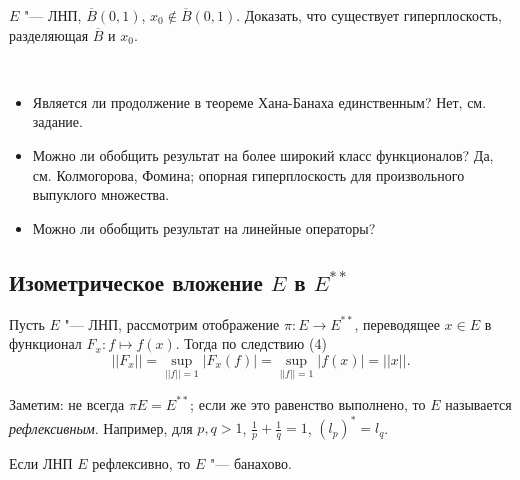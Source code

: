 \documentclass[main]{subfiles}
\begin{document}
\begin{exercise}
  $E$ "--- ЛНП, $\overline{B}(0, 1)$, $x_0 \notin \overline{B}(0, 1)$.
  Доказать, что существует гиперплоскость, разделяющая $\overline{B}$
  и $x_0$.
\end{exercise}

\begin{remark}~
  \begin{itemize}
    \item Является ли продолжение в теореме Хана-Банаха
      единственным? Нет, см. задание.
    \item Можно ли обобщить результат на более широкий класс
      функционалов? Да, см. Колмогорова, Фомина;
      опорная гиперплоскость для произвольного выпуклого множества.
    \item Можно ли обобщить результат на линейные операторы?
  \end{itemize}
\end{remark}

\subsection{Изометрическое вложение $E$ в $E^{**}$}
Пусть $E$ "--- ЛНП, рассмотрим отображение $\pi : E \to E^{**}$,
переводящее $x \in E$ в функционал $F_x : f \mapsto f(x)$.
Тогда по следствию (4)
\[
  ||F_x|| = \sup_{||f|| = 1} |F_x(f)| =
  \sup_{||f|| = 1} |f(x)| = ||x||.
\]

Заметим: не всегда $\pi E = E^{**}$; если же это равенство выполнено,
то $E$ называется \emph{рефлексивным}. Например, для $p, q > 1$,
$\frac1p + \frac1q = 1$, $(l_p)^* = l_q$.

\begin{exercise}
  Если ЛНП $E$ рефлексивно, то $E$ "--- банахово.
\end{exercise}
\end{document}
